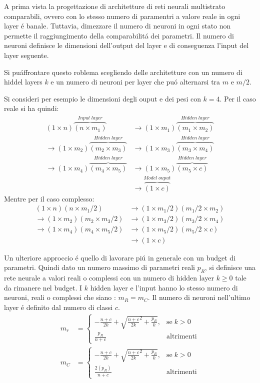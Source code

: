 \documentclass[a4paper,10pt]{article}
\begin{document}
 A prima vista la progettazione di architetture di reti neurali multistrato comparabili, ovvero con lo stesso numero di paramentri a valore reale in ogni layer \'e banale. Tuttavia, dimezzare il numero di neuroni in ogni stato non permette il raggiungimento della comparabilit\'a dei parametri. 
 Il numero di neuroni definisce le dimensioni dell'output del layer e di conseguenza l'input del layer seguente. 
 
 Si pu\' affrontare questo roblema  scegliendo delle architetture con un numero di hiddel layers $k$ e un numero di neuroni per layer che pu\'o alternarsi tra $m$ e $m/2$. 
 
 Si consideri per esempio le dimensioni degli ouput e dei pesi con $k=4$. Per il caso reale si ha quindi:
 \begin{align}
  (1 \times n)\overbrace{(n \times m_1)}^{Input \; layer} &\to (1 \times m_1)\overbrace{(m_1 \times m_2)}^{Hidden \; layer} \\
  \to (1 \times m_2)\overbrace{(m_2 \times m_3)}^{Hidden \; layer} &\to (1 \times m_3)\overbrace{(m_3 \times m_4)}^{Hidden \; layer} \\
  \to (1 \times m_4)\overbrace{(m_4 \times m_5)}^{Hidden \; layer} &\to (1 \times m_5)\overbrace{(m_5 \times c)}^{Hidden \; layer} \\
  &\to \overbrace{(1 \times c)}^{Model \; ouput}
 \end{align}
Mentre per il caso complesso:
 \begin{align}
  (1 \times n)(n \times m_1/2) &\to (1 \times m_1/2)(m_1/2 \times m_2)\\
  \to (1 \times m_2)(m_2 \times m_3/2) &\to (1 \times m_3/2)(m_3/2 \times m_4)\\
  \to (1 \times m_4)(m_4 \times m_5/2) &\to (1 \times m_5/2)(m_5/2 \times c) \\
  &\to (1 \times c)
 \end{align}
 
 Un ulteriore approccio \'e quello di lavorare pi\'u in generale con un budget di parametri. Quindi dato un numero massimo di parametri reali $p_R$, si definisce una rete neurale a valori reali o complessi con un numero di hidden layer $k \ge 0$ tale da rimanere nel budget. I $k$ hidden layer e l'input hanno lo stesso numero di neuroni, reali o complessi che siano : $m_R = m_C$. Il numero di neuroni nell'ultimo layer \'e definito dal numero di classi $c$.
 \begin{align}
  m_r &= \begin{cases}
          -\frac{n+c}{2k} + \sqrt{ \frac{n+c}{2k}^2 + \frac{p_R}{k}}, & \mbox{se} \; k>0\\
          \frac{p_R}{n+c} & \mbox{altrimenti}
         \end{cases} \label{LastLayerR}\\
  m_C &= \begin{cases}
          -\frac{n+c}{2k} + \sqrt{ \frac{n+c}{2k}^2 + \frac{p_R}{k}}, & \mbox{se} \; k>0\\
          \frac{2(p_R)}{n+c} & \mbox{altrimenti}
         \end{cases} \label{LastLayerC}
 \end{align}
\end{document}

